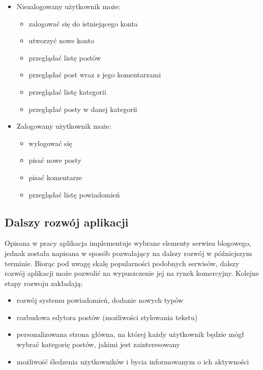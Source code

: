 \documentclass[declaration,shortabstract]{iithesis}
\begin{document}
\begin{itemize}
    \item Niezalogowany użytkownik może: 
    \begin{itemize}
         \item zalogować się do istniejącego konta
         \item utworzyć nowe konto
         \item przeglądać listę postów
         \item przeglądać post wraz z jego komentarzami
         \item przeglądać listę kategorii
         \item przeglądać posty w danej kategorii
    \end{itemize}
    \item Zalogowany użytkownik może:
        \begin{itemize}
            \item wylogować się
            \item pisać nowe posty
            \item pisać komentarze
            \item przeglądać listę powiadomień
        \end{itemize}
\end{itemize}

\subsection{Dalszy rozwój aplikacji}

Opisana w pracy aplikacja implementuje wybrane elementy serwisu blogowego, jednak została napisana w sposób pozwalający na dalszy rozwój w późniejszym terminie. Biorąc pod uwagę skalę popularności podobnych serwisów, dalszy rozwój aplikacji może pozwolić na wypuszczenie jej na rynek komercyjny. Kolejne etapy rozwoju zakładają:
\begin{itemize}
    \item rozwój systemu powiadomień, dodanie nowych typów
    \item rozbudowa edytora postów (możliwości stylowania tekstu)
    \item personalizowana strona główna, na której każdy użytkownik będzie mógł wybrać kategorię postów, jakimi jest zainteresowany
    \item możliwość śledzenia użytkowników i bycia informowanym o ich aktywności
\end{itemize}

\end{document}
